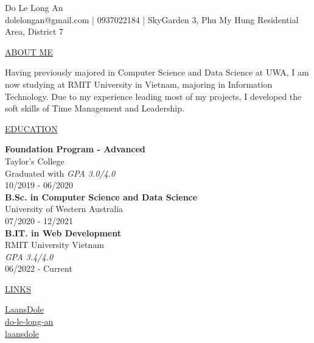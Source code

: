 \documentclass[11pt]{article}
\newcommand{\resumetitle}[3]{
    \AddToShipoutPictureBG{
        \AtPageUpperLeft {
        \raisebox{-0.09\paperheight}{
            \color{black!85}\rule{2\paperwidth}{\paperheight}}
        }}
    \begin{Center}
        \begingroup
        \titlethin
        \color{black!10}\Huge{#1}
        \titlethick
        \color{black!5}\Huge{#2} \\
        \vspace{2mm}
        \textrm{\color{black!15}\Large{#3}}
        \endgroup
    \end{Center}
    \vspace{7mm}
}
\newcommand{\betteruline}[1]{
    \uline{#1}
}
\newcommand{\sectiontitle}[1]{
    \begingroup
        \titlebold
        \betteruline{\Large\uppercase{#1}  }
        \vspace{1.7mm}
    \endgroup
}
\newcommand{\sectioncontent}[1]{
    \begingroup
        \begin{FlushLeft}
        \vspace{-3mm}
        \sffamily\small#1
        \end{FlushLeft}
    \endgroup
    \vspace{2mm}
}
\begin{document}
    \resumetitle{Do}{Le Long An} {
        dolelongan@gmail.com |
        0937022184 |
        SkyGarden 3, Phu My Hung Residential Area, District 7
    }

    \setlength{\columnsep}{7mm}
    \begin{paracol}{2}

    \sectiontitle{about me}
    \sectioncontent{
        Having previously majored in Computer Science and Data Science at UWA, I am now studying at RMIT University in Vietnam, majoring in Information Technology. Due to my experience leading most of my projects, I developed the soft skills of Time Management and Leadership.
    }

    \sectiontitle{education}
    \sectioncontent{
        \textbf{Foundation Program - Advanced} \\
        Taylor's College \\
        Graduated with \textit{GPA 3.0/4.0} \\
        \textcolor{black!70}{10/2019 - 06/2020} \\
        \vspace{2mm}
        \textbf{B.Sc. in Computer Science and Data Science} \\
        University of Western Australia \\
        \textcolor{black!70}{07/2020 - 12/2021} \\
         \vspace{2mm}
        \textbf{B.IT. in Web Development} \\
        RMIT University Vietnam \\
        \textit{GPA 3.4/4.0} \\
        \textcolor{black!70}{06/2022 - Current} \\
    }

    \sectiontitle{links}
    \sectioncontent{
        \hspace{3mm}
        \href{https://github.com/LaansDole}{LaansDole} \\
        \vspace{2mm}
        \faIcon{linkedin-in}\hspace{3mm}
        \href{https://www.linkedin.com/in/do-le-long-an/}{do-le-long-an} \\
        \vspace{2mm}
        \faIcon{facebook}\hspace{3mm}
        \href{https://www.facebook.com/laansdole/}{laansdole}
    }


\end{paracol}
\end{document}
